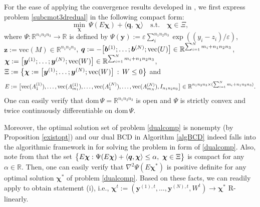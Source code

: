 \documentclass[10pt]{article}
\begin{document}
\begin{appendices}
For the ease of applying the convergence results developed in \cite{lt1992convergence}, we first express problem \eqref{subcmot3dredual} in the following compact form:
\begin{equation}\label{dualcomp}
\min\limits_{\bm{\chi}}~\Psi(E\bm{\chi}) + \langle\bm{q},\,\bm{\chi}\rangle \quad \mathrm{s.t.} \quad \bm{\chi}\in\Xi,
\end{equation}
where $\Psi:\mathbb{R}^{n_1n_2n_3}\to\mathbb{R}$ is defined by $\Psi(\bm{y}):=\varepsilon\sum^{n_1n_2n_3}_{i}\exp((y_i-z_i)/\varepsilon)$, $\bm{z}:=\mathrm{vec}(M)\in\mathbb{R}^{n_1n_2n_3}$, $\bm{q} := -\big{[}\bm{b}^{(1)}; \dots; \bm{b}^{(N)}; \mathrm{vec}(U)\big{]}\in\mathbb{R}^{\sum_{i=1}^N m_i+n_1n_2n_3}$, $\bm{\chi} := \big{[}\bm{y}^{(1)}; \dots; \bm{y}^{(N)}; \mathrm{vec}(W)\big{]}\in\mathbb{R}^{\sum_{i=1}^N m_i+n_1n_2n_3}$, $\Xi := \big{\{} \bm{\chi} := \big{[}\bm{y}^{(1)}; \dots; \bm{y}^{(N)}; \mathrm{vec}(W)\big{]}\,:\, W\leq0 \big{\}}$ and
\begin{equation*}
E := \big{[}\mathrm{vec}(A_1^{(1)}),\dots , \mathrm{vec}(A_{m_1}^{(1)}),\dots,  \mathrm{vec}(A_1^{(N)}),\dots , \mathrm{vec}(A_{m_N}^{(N)}),I_{n_1n_2n_3} \big{]}
\in\mathbb{R}^{n_1n_2n_3\times(\sum_{i=1}^N m_i+n_1n_2n_3)}.
\end{equation*}
One can easily verify that $\mathrm{dom}\,\Psi=\mathbb{R}^{n_1n_2n_3}$ is open and $\Psi$ is strictly convex and twice continuously differentiable on $\mathrm{dom}\,\Psi$.

Moreover, the optimal solution set  of problem \eqref{dualcomp} is nonempty (by Proposition \ref{existopt}) and our dual BCD in Algorithm \ref{algBCD} indeed falls into the algorithmic framework in \cite{lt1992convergence} for solving the problem in form of \eqref{dualcomp}. Also, note from \cite[Lemma 3.3]{lt1992convergence} that the set $\big{\{}E\bm{\chi}:\Psi(E\bm{\chi})+\langle\bm{q},\bm{\chi}\rangle \leq \alpha, ~\bm{\chi}\in\Xi\big{\}}$ is compact for any $\alpha\in\mathbb{R}$. Then, one can easily verify that $\nabla^2\Psi(E\bm{\chi}^*)$ is positive definite for any optimal solution $\bm{\chi}^*$ of problem \eqref{dualcomp}. Based on these facts, we can readily apply \cite[Theorem 2.1]{lt1992convergence} to obtain statement (i), i.e., $\bm{\chi}^t  := (\bm{y}^{(1),t},\dots,\bm{y}^{(N),t},W^t) \to \bm{\chi}^*$ R-linearly.


\end{appendices}
\end{document}
